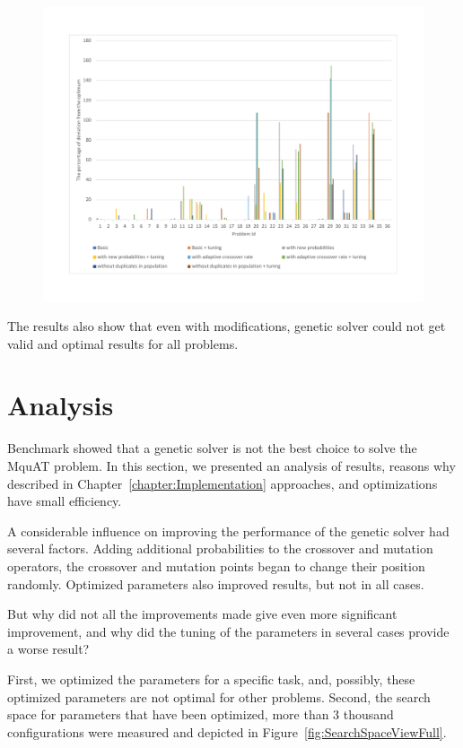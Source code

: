 \begin{figure}
	\centering
	\includegraphics[width=\textwidth]{images/EnergyPercentage.pdf}
	\caption[]{}
	\label{fig:EnergyPercentage}
\end{figure}

The results also show that even with modifications, genetic solver could not get valid and optimal results for all problems.


\section{Analysis}

Benchmark showed that a genetic solver is not the best choice to solve the MquAT problem.
In this section, we presented an analysis of results, reasons why described in Chapter~\ref{chapter:Implementation} approaches, and optimizations have small efficiency.

A considerable influence on improving the performance of the genetic solver had several factors. Adding additional probabilities to the crossover and mutation operators, the crossover and mutation points began to change their position randomly.
Optimized parameters also improved results, but not in all cases.

But why did not all the improvements made give even more significant improvement, and why did the tuning of the parameters in several cases provide a worse result?

First, we optimized the parameters for a specific task, and, possibly, these optimized parameters are not optimal for other problems.
Second, the search space for parameters that have been optimized, more than 3 thousand configurations were measured and depicted in Figure~\ref{fig:SearchSpaceViewFull}.

